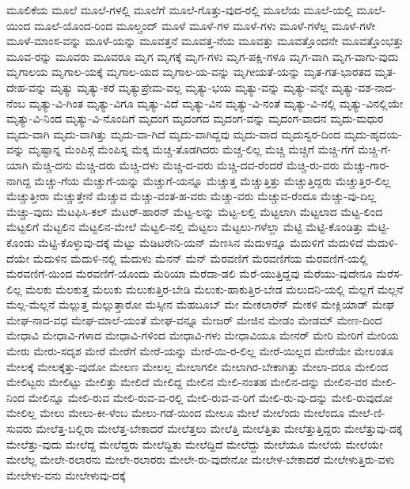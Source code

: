 {ಮೂಲಿಕೆಯ
ಮೂಲೆ
ಮೂಲೆ-ಗಳಲ್ಲಿ
ಮೂಲೆಗೆ
ಮೂಲೆ-ಗೊತ್ತು-ವುದ-ರಲ್ಲಿ
ಮೂಲೆಯ
ಮೂಲೆ-ಯಲ್ಲಿ
ಮೂಲೆ-ಯಿಂದ
ಮೂಲೆ-ಯೊಂದ-ರಿಂದ
ಮೂಲ್ಚಂದ್
ಮೂಳೆ
ಮೂಳೆ-ಗಳ
ಮೂಳೆ-ಗಳು
ಮೂಳೆ-ಗಳೆಲ್ಲ
ಮೂಳೆ-ಗಳೇ
ಮೂಳೆ-ಮಾಂಸ-ವನ್ನು
ಮೂಳೆ-ಯನ್ನು
ಮೂವತ್ತನೆ
ಮೂವತ್ತ-ನೆಯ
ಮೂವತ್ತು
ಮೂವತ್ತೊಂದನೇ
ಮೂವತ್ತೊಂಭತ್ತು
ಮೂವ-ರನ್ನು
ಮೂವರು
ಮೂವರೂ
ಮೃಗ
ಮೃಗಕ್ಕೆ
ಮೃಗ-ಗಳು
ಮೃಗ-ಪಕ್ಷಿ-ಗಳೂ
ಮೃಗ-ವಾಗಿ
ಮೃಗ-ವಾಗು-ವುದು
ಮೃಗಾಲಯ
ಮೃಗಾಲ-ಯಕ್ಕೆ
ಮೃಗಾಲ-ಯದ
ಮೃಗಾಲ-ಯ-ವನ್ನು
ಮೃಗೀಯತೆ-ಯನ್ನು
ಮೃತ-ಗತ-ಭಾರತದ
ಮೃತ-ದೇಹ-ವನ್ನು
ಮೃತ್ಯು
ಮೃತ್ಯು-ಕರೆ
ಮೃತ್ಯುಪ್ರೇಮ-ವಲ್ಲ
ಮೃತ್ಯು-ಭಯ
ಮೃತ್ಯು-ವನ್ನು
ಮೃತ್ಯು-ವನ್ನೇ
ಮೃತ್ಯು-ವಶ-ನಾದ-ನೆಂಬ
ಮೃತ್ಯು-ವಿ-ಗಿಂತ
ಮೃತ್ಯು-ವಿಗೂ
ಮೃತ್ಯು-ವಿದೆ
ಮೃತ್ಯು-ವಿನ
ಮೃತ್ಯು-ವಿ-ನಂತೆ
ಮೃತ್ಯು-ವಿ-ನಲ್ಲಿ
ಮೃತ್ಯು-ವಿನಲ್ಲಿಯೇ
ಮೃತ್ಯು-ವಿ-ನಿಂದ
ಮೃತ್ಯು-ವಿ-ನೊಂದಿಗೆ
ಮೃದಂಗ
ಮೃದಂಗದ
ಮೃದಂಗ-ವನ್ನು
ಮೃದಂಗ-ವಾದನ
ಮೃದು-ಮಧುರ
ಮೃದು-ವಾಗಿ
ಮೃದು-ವಾಗಿತ್ತು
ಮೃದು-ವಾ-ಗಿದೆ
ಮೃದು-ವಾಗಿದ್ದವು
ಮೃದು-ವಾದ
ಮೃದುಸ್ವರ-ದಿಂದ
ಮೃದು-ಹೃದಯ-ವನ್ನು
ಮೃಷ್ಟಾನ್ನ
ಮೆಂಪಿಸ್ಗೆ
ಮೆಂಪಿಸ್ನ
ಮೆಕ್ಕ
ಮೆಚ್ಚ-ತೊಡಗಿದರು
ಮೆಚ್ಚ-ಲಿಲ್ಲ
ಮೆಚ್ಚಿ
ಮೆಚ್ಚಿಗೆ
ಮೆಚ್ಚಿ-ಗೆಗೆ
ಮೆಚ್ಚಿ-ಗೆ-ಯಾಗಿ
ಮೆಚ್ಚಿ-ದನು
ಮೆಚ್ಚಿ-ದರು
ಮೆಚ್ಚಿ-ದಳು
ಮೆಚ್ಚಿ-ದ-ವರು
ಮೆಚ್ಚಿ-ದವ-ರೆಂದರೆ
ಮೆಚ್ಚಿ-ರು-ವರು
ಮೆಚ್ಚು-ಗಾರ-ನಾಗಿದ್ದ
ಮೆಚ್ಚು-ಗೆಯ
ಮೆಚ್ಚುಗೆ-ಯನ್ನು
ಮೆಚ್ಚುಗೆ-ಯನ್ನೂ
ಮೆಚ್ಚುತ್ತ
ಮೆಚ್ಚುತ್ತಿತ್ತು
ಮೆಚ್ಚುತ್ತಿದ್ದರು
ಮೆಚ್ಚುತ್ತಿರ-ಲಿಲ್ಲ
ಮೆಚ್ಚುತ್ತೀರಾ
ಮೆಚ್ಚುತ್ತೇನೆ
ಮೆಚ್ಚುವ
ಮೆಚ್ಚು-ವಂತ-ಹ-ವರು
ಮೆಚ್ಚು-ವರು
ಮೆಚ್ಚುವ-ರೆಂದೂ
ಮೆಚ್ಚು-ವು-ದಿಲ್ಲ
ಮೆಚ್ಚು-ವುದು
ಮೆಟಫಿಸಿ-ಕಲ್
ಮೆಟರ್-ಹಾರನ್
ಮೆಟ್ಟ-ಲನ್ನು
ಮೆಟ್ಟ-ಲಲ್ಲಿ
ಮೆಟ್ಟಲಾಗಿ
ಮೆಟ್ಟಲಾದ
ಮೆಟ್ಟ-ಲಿಂದ
ಮೆಟ್ಟಲಿಗೆ
ಮೆಟ್ಟಲಿನ
ಮೆಟ್ಟಲಿನ-ಮೇಲೆ
ಮೆಟ್ಟಲಿ-ನಲ್ಲಿ
ಮೆಟ್ಟಲು
ಮೆಟ್ಟಲು-ಗಳೆಲ್ಲಾ
ಮೆಟ್ಟಿ
ಮೆಟ್ಟಿ-ಕೊಂಡಿತ್ತು
ಮೆಟ್ಟಿ-ಕೊಂಡು
ಮೆಟ್ಟಿ-ಕೊಳ್ಳುವು-ದಕ್ಕೆ
ಮೆಟ್ಟು
ಮೆಡಿಟರೇನಿ-ಯನ್
ಮೆಣಸಿನ
ಮೆದುಳನ್ನೂ
ಮೆದುಳಿಗೆ
ಮೆದುಳಿದೆ
ಮೆದುಳಿ-ದೆಯೇ
ಮೆದುಳಿನ
ಮೆದುಳಿ-ನಲ್ಲಿ
ಮೆದುಳು
ಮೆನನ್
ಮೆನ್
ಮೆರವಣಿಗೆ
ಮೆರವಣಿಗೆಯ
ಮೆರವಣಿಗೆ-ಯಲ್ಲಿ
ಮೆರವಣಿಗೆ-ಯಿಂದ
ಮೆರವಣಿಗೆ-ಯೊಂದು
ಮೆರಿಯಾ
ಮೆರೆದಾ-ಡಲಿ
ಮೆರೆ-ಯುತ್ತಿದ್ದವು
ಮೆರೆಯು-ವುದೇನೂ
ಮೆರೆಸ-ಲಿಲ್ಲ
ಮೆಲಕು
ಮೆಲಕುತ್ತ
ಮೆಲುಕು
ಮೆಲುಕುತ್ತಿರ-ಬೇಡಿ
ಮೆಲುಕು-ಹಾಕುತ್ತಿರ-ಬೇಡ
ಮೆಲುದನಿ-ಯಲ್ಲಿ
ಮೆಲ್ಲಗೆ
ಮೆಲ್ಲನೆ
ಮೆಲ್ಲ-ಮೆಲ್ಲನೆ
ಮೆಲ್ಲುತ್ತ
ಮೆಲ್ಲುತ್ತಾರೋ
ಮೆಸ್ಸೀನ
ಮೆಹಬೂಬ್
ಮೇ
ಮೇಕಲಾರೆನ್
ಮೇಕಳಿ
ಮೇಕ್ಲಿಯಾಡ್
ಮೇಘ
ಮೇಘ-ನಾದ-ವಧ
ಮೇಘ-ಮಾಲೆ-ಯಂತೆ
ಮೇಘ-ವನ್ನೂ
ಮೇಜರ್
ಮೇಜಿನ
ಮೇಡಂ
ಮೇಡಮ್
ಮೇಣ-ದಿಂದ
ಮೇಧಾವಿ
ಮೇಧಾವಿ-ಗಳಾದ
ಮೇಧಾವಿ-ಗಳಿಂದ
ಮೇಧಾವಿ-ಗಳು
ಮೇಧಾವಿಯೂ
ಮೇನರ್
ಮೇರಿ
ಮೇರಿಗೆ
ಮೇರಿಯ
ಮೇರು
ಮೇರು-ಸದೃಶ
ಮೇರೆ
ಮೇರೆಗೆ
ಮೇರೆ-ಯನ್ನು
ಮೇರೆ-ಯಿ-ರ-ಲಿಲ್ಲ
ಮೇರೆ-ಯಿಲ್ಲದ
ಮೇರೆಯೇ
ಮೇಲಂತೂ
ಮೇಲಕ್ಕೆ
ಮೇಲಕ್ಕೆತ್ತು-ವುದೋ
ಮೇಲಣ
ಮೇಲಲ್ಲ
ಮೇಲಾಗಲೀ
ಮೇಲಾಗಿರ-ಬೇಕಾಗಿತ್ತು
ಮೇಲಾ-ದರೂ
ಮೇಲಿಂದ
ಮೇಲಿಟ್ಟರು
ಮೇಲಿಟ್ಟು
ಮೇಲಿತ್ತು
ಮೇಲಿದೆ
ಮೇಲಿದ್ದ
ಮೇಲಿನ
ಮೇಲಿ-ನಂತಹ
ಮೇಲಿನ-ದನ್ನು
ಮೇಲಿನ-ವರ
ಮೇಲಿ-ನಿಂದ
ಮೇಲಿನ್ನೂ
ಮೇಲಿ-ರುವ
ಮೇಲಿ-ರುವ-ವ-ರಲ್ಲಿ
ಮೇಲಿ-ರುವ-ವ-ರಿಗೆ
ಮೇಲಿ-ರು-ವು-ದನ್ನು
ಮೇಲಿ-ರುವುದೋ
ಮೇಲಿಲ್ಲ
ಮೇಲು
ಮೇಲು-ಕೀ-ಳೆಂಬ
ಮೇಲು-ಗಡೆ-ಯಿಂದ
ಮೇಲೂ
ಮೇಲೆ
ಮೇಲೆಂದು
ಮೇಲೆಂದೂ
ಮೇಲೆ-ಣಿ-ಸುವರು
ಮೇಲೆತ್ತ-ಬಲ್ಲಿರಾ
ಮೇಲೆತ್ತ-ಬೇಕಾದರೆ
ಮೇಲೆತ್ತಲು
ಮೇಲೆತ್ತಿ
ಮೇಲೆತ್ತಿತು
ಮೇಲೆತ್ತುತ್ತಿದ್ದರು
ಮೇಲೆತ್ತುವು-ದಕ್ಕೆ
ಮೇಲೆತ್ತು-ವುದು
ಮೇಲೆದ್ದ
ಮೇಲೆದ್ದರು
ಮೇಲೆದ್ದಿತು
ಮೇಲೆದ್ದಿದೆ
ಮೇಲೆದ್ದು
ಮೇಲೆಯೂ
ಮೇಲೆಯೆ
ಮೇಲೆಯೇ
ಮೇಲೆಲ್ಲ
ಮೇಲೇ-ರಲಾರನು
ಮೇಲೇ-ರಲಾರರು
ಮೇಲೇ-ರು-ವುದೇನೋ
ಮೇಲೇಳ-ಬೇಕಾದರೆ
ಮೇಲೇಳುತ್ತಿರು-ವಳು
ಮೇಲೇಳು-ವನು
ಮೇಲೇಳುವು-ದಕ್ಕೆ
}
